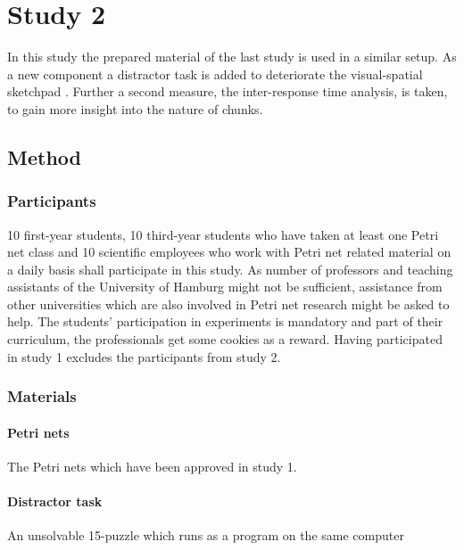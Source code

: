 \section{Study 2}

In this study the prepared material of the last study is used in a similar setup.
As a new component a distractor task is added to deteriorate the visual-spatial sketchpad \parencites(cf.)(){baddeley1986working}.
Further a second measure, the inter-response time analysis, is taken, to gain more insight into the nature of chunks.

\subsection{Method}

\subsubsection{Participants}
10 first-year students, 10 third-year students who have taken at least one Petri net class and 10 scientific employees who work with Petri net related material on a daily basis shall participate in this study.
As number of professors and teaching assistants of the University of Hamburg might not be sufficient, assistance from other universities which are also involved in Petri net research might be asked to help.
The students' participation in experiments is mandatory and part of their curriculum, the professionals get some cookies as a reward.
Having participated in study 1 excludes the participants from study 2.

\subsubsection{Materials}

\paragraph{Petri nets} The Petri nets which have been approved in study 1.

\paragraph{Distractor task} An unsolvable 15-puzzle \parencites(cf.)(){ratner1986finding} which runs as a program on the same computer 


